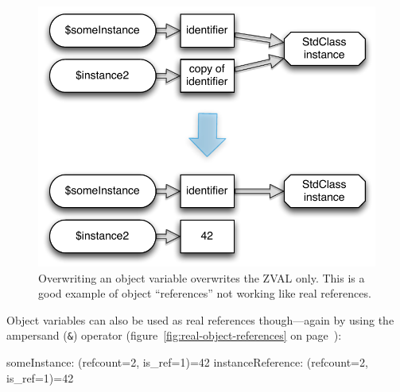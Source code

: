 
\begin{figure}[htb]
  \begin{center}
    \includegraphics[scale=0.8]{images/someInstance_instance2}
    \caption{Overwriting an object variable overwrites the ZVAL only. This is a good example of object ``references'' not working like real references.}
    \label{fig:false-object-references}
  \end{center}
\end{figure}

Object variables can also be used as real references though---again by using the ampersand (\texttt{\&}) operator (figure~\ref{fig:real-object-references} on page~\pageref{fig:real-object-references}):


\begin{textcode}
someInstance: (refcount=2, is_ref=1)=42
instanceReference: (refcount=2, is_ref=1)=42
\end{textcode}

